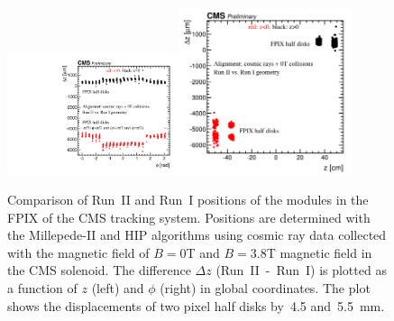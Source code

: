 \begin{figure}[htb]
    \begin{center}
        \includegraphics[width=0.45\textwidth]{../figs/Alignment/AlRes_phi_vs_dz_PXF_1.pdf}\includegraphics[width=0.45\textwidth]{../figs/Alignment/AlRes_z_vs_dz_PXF_1.png}
    \end{center}
    \caption{Comparison of Run~II and Run~I positions of the modules in the FPIX of the CMS tracking system. Positions are determined with the Millepede-II and HIP algorithms using cosmic ray data collected with the magnetic field of $B=$0T and $B=$3.8T magnetic field in the CMS solenoid. The difference $\Delta z$ (Run~II~-~Run~I) is plotted as a function of $z$ (left) and $\phi$ (right) in global coordinates. The plot shows the displacements of two pixel half disks by~4.5 and~5.5~mm.}
    \label{fig:GCP_FPIX}
\end{figure}

